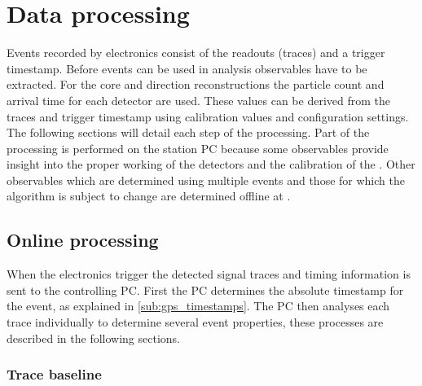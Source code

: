 \chapter{Data processing}
\label{ch:data_processing}

Events recorded by \hisparc electronics consist of the \pmt readouts (traces) and a trigger timestamp. Before events can be used in analysis observables have to be extracted. For the core and direction reconstructions the particle count and arrival time for each detector are used. These values can be derived from the traces and trigger timestamp using calibration values and configuration settings. The following sections will detail each step of the processing. Part of the processing is performed on the station PC because some observables provide insight into the proper working of the detectors and the calibration of the \pmts. Other observables which are determined using multiple events and those for which the algorithm is subject to change are determined offline at \nikhef.


\section{Online processing}
\label{sec:online}

When the \hisparc electronics trigger the detected signal traces and timing information is sent to the controlling PC. First the PC determines the absolute \gps timestamp for the event, as explained in \cref{sub:gps_timestamps}. The PC then analyses each trace individually to determine several event properties, these processes are described in the following sections.


\subsection{Trace baseline}

